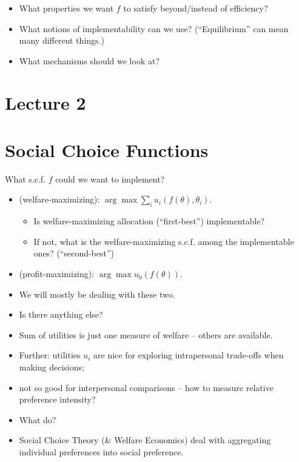 \documentclass[english]{beamer}		%
\def\lyxframeend{} %
\begin{document}
\begin{itemize}
	\item What properties we want $f$ to satisfy beyond/instead of efficiency?
	\item What notions of implementability can we use? (``Equilibrium'' can mean many different things.)
	\item What mechanisms should we look at?
\end{itemize}
\lyxframeend





\maketitle

\section{Lecture 2}

\section{Social Choice Functions}


What s.c.f. $f$ could we want to implement?
\begin{itemize}
	\item {} (welfare-maximizing): $\arg \max \sum_i u_i(f(\theta),\theta_i)$.
	\begin{itemize}
		\item Is welfare-maximizing allocation (``first-best'') implementable?
		\item If not, what is the welfare-maximizing s.c.f. among the implementable ones? (``second-best'')
	\end{itemize}
	\pause
	\item {} (profit-maximizing): $\arg \max u_0(f(\theta))$.
	\pause
	\item We will mostly be dealing with these two.
	\item Is there anything else?
\end{itemize}
\lyxframeend


\begin{itemize}
	\item Sum of utilities is just one measure of welfare -- others are available.
	\item Further: utilities $u_i$ are nice for exploring intrapersonal trade-offs when making decisions;
	\item not so good for interpersonal comparisons -- how to measure relative preference intensity?
	\item What do?
	\pause
	\item Social Choice Theory (\& Welfare Economics) deal with aggregating individual preferences into social preference.
\end{itemize}
\lyxframeend
\end{document}

